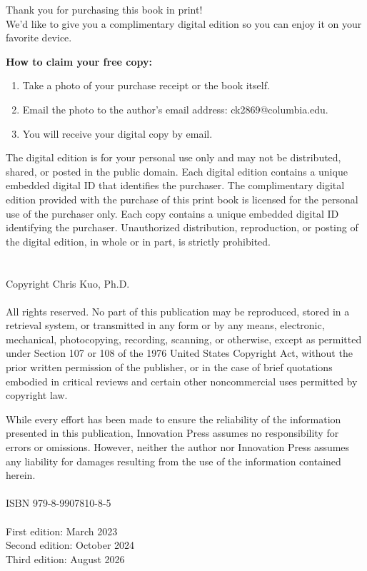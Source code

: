 \documentclass[graybox]{style/svmult}
\begin{document}

\newpage
\vspace*{\fill}
\footnotesize

 \noindent Thank you for purchasing this book in print! \\
We’d like to give you a complimentary digital edition so you can enjoy it on your favorite device.

 \noindent \textbf{How to claim your free copy:}
\begin{enumerate}
\item Take a photo of your purchase receipt or the book itself.
\item Email the photo to the author's email address: ck2869@columbia.edu.
\item You will receive your digital copy by email.
\end{enumerate}

 \noindent The digital edition is for your personal use only and may not be distributed, shared, or posted in the public domain.
Each digital edition contains a unique embedded digital ID that identifies the purchaser. The complimentary digital edition provided with the purchase of this print book is licensed for the personal use of the purchaser only. Each copy contains a unique embedded digital ID identifying the purchaser. Unauthorized distribution, reproduction, or posting of the digital edition, in whole or in part, is strictly prohibited.
\\
\\
\\
\noindent Copyright \textcopyright{} \the\year{} Chris Kuo, Ph.D. \\
\\
\noindent  All rights reserved. No part of this publication may be reproduced, stored in a retrieval system, or transmitted in any form or by any means, electronic, mechanical, photocopying, recording, scanning, or otherwise, except as permitted under Section 107 or 108 of the 1976 United States Copyright Act, without the prior written permission of the publisher, or in the case of brief quotations embodied in critical reviews and certain other noncommercial uses permitted by copyright law. 

\noindent  
While every effort has been made to ensure the reliability of the information presented in this publication, Innovation Press assumes no responsibility for errors or omissions. However, neither the author nor Innovation Press assumes any liability for damages resulting from the use of the information contained herein. \\
\\
\noindent  ISBN 979-8-9907810-8-5
\\
\\
\noindent First edition:  March 2023 \\
\noindent Second edition:  October 2024 \\
\noindent Third edition:  August 2026 \\
\end{document}
